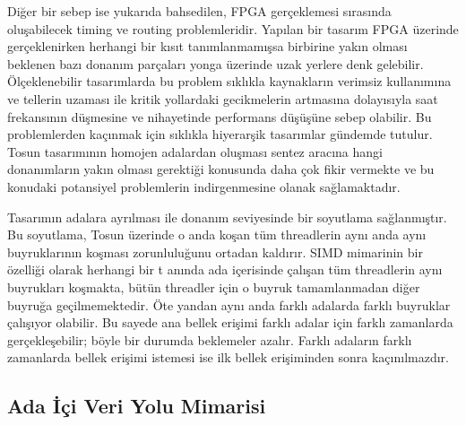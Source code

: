 Diğer bir sebep ise yukarıda bahsedilen, FPGA gerçeklemesi sırasında oluşabilecek timing ve routing problemleridir. Yapılan bir tasarım FPGA üzerinde gerçeklenirken herhangi bir kısıt tanımlanmamışsa birbirine yakın olması beklenen bazı donanım parçaları yonga üzerinde uzak yerlere denk gelebilir. Ölçeklenebilir tasarımlarda bu problem sıklıkla kaynakların verimsiz kullanımına ve tellerin uzaması ile kritik yollardaki gecikmelerin artmasına dolayısıyla saat frekansının düşmesine ve nihayetinde performans düşüşüne sebep olabilir. Bu problemlerden kaçınmak için sıklıkla hiyerarşik tasarımlar gündemde tutulur. Tosun tasarımının homojen adalardan oluşması sentez aracına hangi donanımların yakın olması gerektiği konusunda daha çok fikir vermekte ve bu konudaki potansiyel problemlerin indirgenmesine olanak sağlamaktadır.\par 
Tasarımın adalara ayrılması ile donanım seviyesinde bir soyutlama sağlanmıştır. Bu soyutlama, Tosun üzerinde o anda koşan tüm threadlerin aynı anda aynı buyruklarının koşması zorunluluğunu ortadan kaldırır. SIMD mimarinin bir özelliği olarak herhangi bir t anında ada içerisinde çalışan tüm threadlerin aynı buyrukları koşmakta, bütün threadler için o buyruk tamamlanmadan diğer buyruğa geçilmemektedir. Öte yandan aynı anda farklı adalarda farklı buyruklar çalışıyor olabilir. Bu sayede ana bellek erişimi farklı adalar için farklı zamanlarda gerçekleşebilir; böyle bir durumda beklemeler azalır. Farklı adaların farklı zamanlarda bellek erişimi istemesi ise ilk bellek erişiminden sonra kaçınılmazdır.  

\subsection{Ada İçi Veri Yolu Mimarisi}

